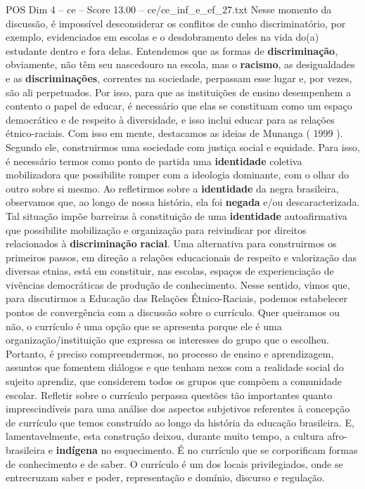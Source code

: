 \begin{textsample}{POS Dim 4 – ce – Score 13.00 – ce/ce\_inf\_e\_ef\_27.txt}
Nesse momento da discussão, é impossível desconsiderar os conflitos de cunho discriminatório, por exemplo, evidenciados em escolas e o desdobramento deles na vida do(a) estudante dentro e fora delas.
Entendemos que as formas de \textbf{discriminação}, obviamente, não têm seu nascedouro na escola, mas o \textbf{racismo}, as desigualdades e as \textbf{discriminações}, correntes na sociedade, perpassam esse lugar e, por vezes, são ali perpetuados.
Por isso, para que as instituições de ensino desempenhem a contento o papel de educar, é necessário que elas se constituam como um espaço democrático e de respeito à diversidade, e isso inclui educar para as relações étnico-raciais.
Com isso em mente, destacamos as ideias de Munanga ( 1999 ).
Segundo ele, construirmos uma sociedade com justiça social e equidade.
Para isso, é necessário termos como ponto de partida uma \textbf{identidade} coletiva mobilizadora que possibilite romper com a ideologia dominante, com o olhar do outro sobre si mesmo.
Ao refletirmos sobre a \textbf{identidade} da negra brasileira, observamos que, ao longo de nossa história, ela foi \textbf{negada} e/ou descaracterizada.
Tal situação impõe barreiras à constituição de uma \textbf{identidade} autoafirmativa que possibilite mobilização e organização para reivindicar por direitos relacionados à \textbf{discriminação} \textbf{racial}.
Uma alternativa para construirmos os primeiros passos, em direção a relações educacionais de respeito e valorização das diversas etnias, está em constituir, nas escolas, espaços de experienciação de vivências democráticas de produção de conhecimento.
Nesse sentido, vimos que, para discutirmos a Educação das Relações Étnico-Raciais, podemos estabelecer pontos de convergência com a discussão sobre o currículo.
Quer queiramos ou não, o currículo é uma opção que se apresenta porque ele é uma organização/instituição que expressa os interesses do grupo que o escolheu.
Portanto, é preciso compreendermos, no processo de ensino e aprendizagem, assuntos que fomentem diálogos e que tenham nexos com a realidade social do sujeito aprendiz, que considerem todos os grupos que compõem a comunidade escolar.
Refletir sobre o currículo perpassa questões tão importantes quanto imprescindíveis para uma análise dos aspectos subjetivos referentes à concepção de currículo que temos construído ao longo da história da educação brasileira.
E, lamentavelmente, esta construção deixou, durante muito tempo, a cultura afro-brasileira e \textbf{indígena} no esquecimento.
É no currículo que se corporificam formas de conhecimento e de saber.
O currículo é um dos locais privilegiados, onde se entrecruzam saber e poder, representação e domínio, discurso e regulação.

\end{textsample}
